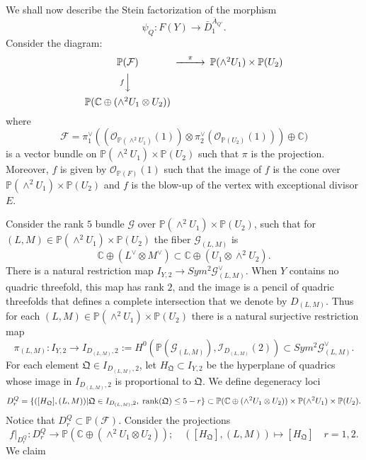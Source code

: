\documentclass[a4paper,11pt]{amsart}
\theoremstyle{definition}
\numberwithin{equation}{section}
\numberwithin{equation}{section} \theoremstyle{definition}
\begin{document}
We shall now describe the Stein factorization of the morphism
\[
\psi_Q: F(Y)\to \bar{D}^{\bar{A}_{Q'}}_1.
\]
Consider the diagram:
$$\begin{CD} {{\mathbb{P}}}({{\mathcal F}}) @>\pi>>{{\mathbb{P}}}(\wedge^2 U_1)\times {{\mathbb{P}}}(U_2)\\
@V f VV @.\\
{{\mathbb{P}}}({{\mathbb{C}  }}\oplus (\wedge^2 U_1\otimes U_2)) @. \end{CD}$$
where 
\begin{equation}\label{F} {{\mathcal F}}=\pi_1^{\vee}( ({\mathcal O}_{{{\mathbb{P}}}(\wedge^2 U_1)}(1)) \otimes \pi_2^{\vee} ({\mathcal O}_{{{\mathbb{P}}}(U_2)}(1)))\oplus {{\mathbb{C}  }} ) \end{equation} is a vector bundle on  ${{\mathbb{P}}}(\wedge^2 U_1)\times {{\mathbb{P}}}(U_2)$ such that $\pi$ is the projection. Moreover, $f$ is given by ${\mathcal O}_{{{\mathbb{P}}}(F)}(1)$ such that the image of $f$ is the cone over ${{\mathbb{P}}}(\wedge^2 U_1)\times {{\mathbb{P}}}(U_2)$ and $f$ is the blow-up of the vertex with exceptional divisor $E$.

Consider the rank $5$ bundle ${{\mathcal G}}$ over ${{\mathbb{P}}}(\wedge^2 U_1)\times {{\mathbb{P}}}(U_2)$, such that for $(L,M)\in {{\mathbb{P}}}(\wedge^2 U_1)\times {{\mathbb{P}}}(U_2)$ 
the fiber ${{\mathcal G}}_{(L,M)}$ is $${{\mathbb{C}  }}\oplus(L^{\vee}\otimes M^{\vee})\subset {{\mathbb{C}  }}\oplus ( U_1\otimes \wedge^2 U_2).$$ 
There is a natural restriction map $I_{Y,2}\to Sym^2{{\mathcal G}}^{\vee}_{(L,M)}$.  When $Y$ contains no quadric threefold, this map has rank $2$, and the image is a pencil of quadric threefolds that defines a complete intersection that we denote by $D_{(L,M)}$.   Thus for each $(L,M)\in {{\mathbb{P}}}(\wedge^2 U_1)\times {{\mathbb{P}}}(U_2)$  there is a
natural surjective restriction map 
\[
\pi_{(L,M)}:I_{Y,2}\to I_{D_{(L,M)},2}:=H^0({{\mathbb{P}}}({{\mathcal G}}_{(L,M)}),\mathcal{I}_{D_{(L,M)}}(2))\subset Sym^2{{\mathcal G}}^{\vee}_{(L,M)}.
\]
For each element $\mathfrak{Q}\in I_{D_{(L,M)},2}$, let $H_{\mathfrak{Q}}\subset I_{Y,2}$ be the hyperplane of quadrics whose image in $I_{D_{(L,M)},2}$ is proportional to ${\mathfrak{Q}}$.
We define degeneracy loci
\[
D^Q_r=\{ ([H_{\mathfrak{Q}}],(L,M))| {\mathfrak{Q}}\in I_{D_{(L,M)},2},
\;{\rm rank}({\mathfrak{Q}})\leq 5-r  \}\subset {{\mathbb{P}}}({{\mathbb{C}  }}\oplus (\wedge^2 U_1\otimes U_2))  \times {{\mathbb{P}}}(\wedge^2 U_1)\times {{\mathbb{P}}}(U_2).
\]
Notice that  $D^Q_r\subset {{\mathbb{P}}}({{\mathcal F}})$. 
Consider the projections
\[
f|_{D^Q_r}:D^Q_r\to  {{\mathbb{P}}}({{\mathbb{C}  }}\oplus (\wedge^2 U_1\otimes U_2)); \quad ([H_{\mathfrak{Q}}],(L,M))\mapsto [H_{\mathfrak{Q}}] \quad r=1,2.
\]
We claim 
\end{document}
